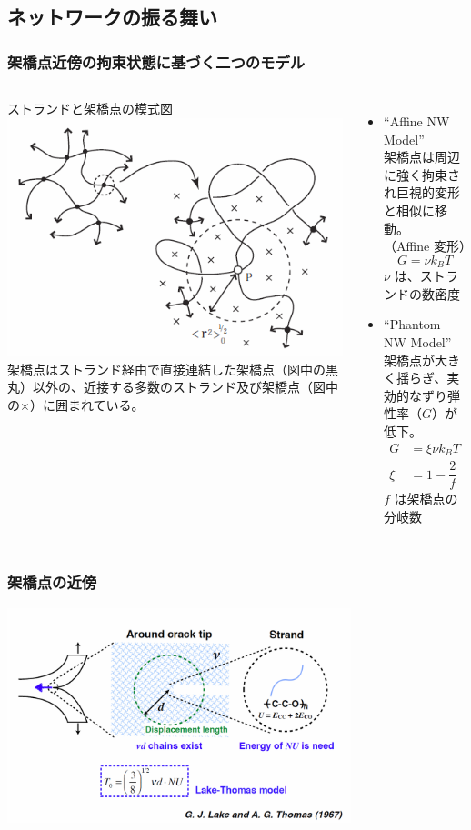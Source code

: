 \documentclass[11pt, dvipdfmx]{beamer}
\begin{document}
\subsection{ネットワークの振る舞い}
\begin{frame}
\frametitle{架橋点近傍の拘束状態に基づく二つのモデル}
\begin{columns}[totalwidth=1\textwidth]
ストランドと架橋点の模式図
\includegraphics[width=\textwidth]{./fig/JP_vicinity.png}
架橋点はストランド経由で直接連結した架橋点（図中の黒丸）以外の、近接する多数のストランド及び架橋点（図中の×）に囲まれている。
\begin{itemize}
\item
``Affine NW Model''\\
架橋点は周辺に強く拘束され巨視的変形と相似に移動。\\（Affine 変形）
\footnotesize
\begin{equation*}
G=\nu k_B T
\end{equation*}
\normalsize
$\nu$ は、ストランドの数密度
\item
``Phantom NW Model''\\
架橋点が大きく揺らぎ、実効的なずり弾性率（$G$）が低下。
\footnotesize
\begin{align*}
G&=\xi \nu k_B T \\
\xi&= 1 -\dfrac{2}{f}
\end{align*}
\normalsize
$f$ は架橋点の分岐数
\end{itemize}
\end{columns}
\end{frame}

\begin{frame}
\frametitle{架橋点の近傍}
\centering
\includegraphics[width=100mm]{./fig/Lake_Thomas.png}
\end{frame}
\end{document}
